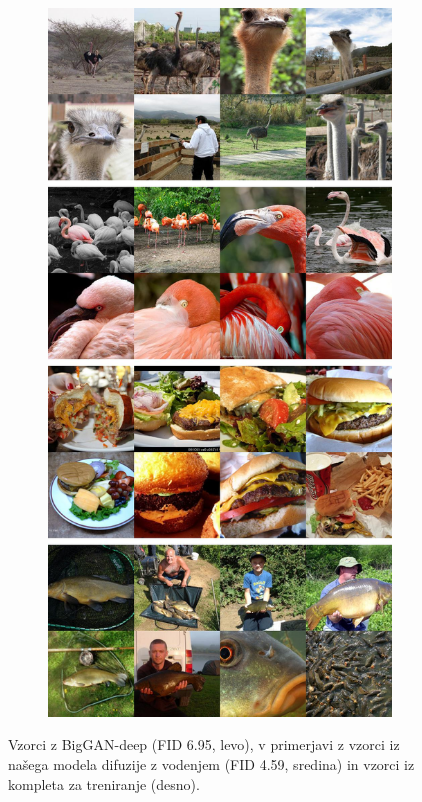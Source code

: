 \documentclass[12pt, a4paper]{article}
\begin{document}
\begin{figure}[ht]
\begin{center}
\begin{subfigure}[]{0.25\textwidth}
    \end{subfigure}\quad
    \begin{subfigure}[]{0.25\textwidth}
    \centerline{\includegraphics[width=\textwidth]{Images/samples/reflow_real.jpg}}
    \end{subfigure}
    \caption{Vzorci z BigGAN-deep (FID 6.95, levo), v primerjavi z vzorci iz našega modela difuzije z vodenjem (FID 4.59, sredina) in vzorci iz kompleta za treniranje (desno).}
    \label{fig:flamingos}
    \end{center}
    \vskip -0.2in
\end{figure}
\end{document}
